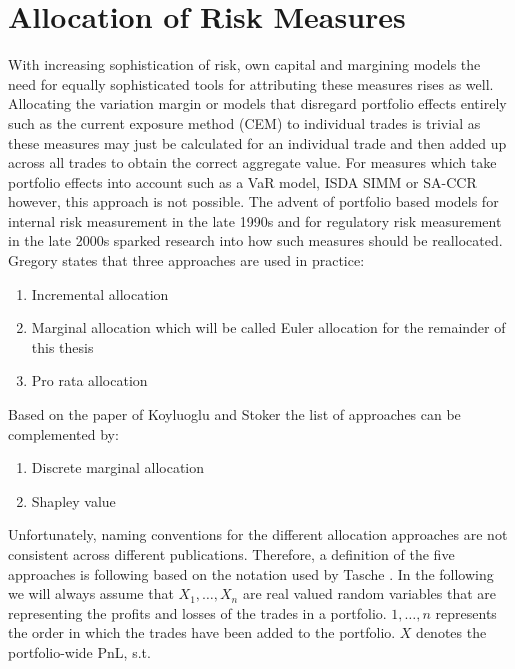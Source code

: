 \documentclass[../Thesis_AHoecherl.tex]{subfiles}
\begin{document}
\section{Allocation of Risk Measures}\label{sec:Allocation of Risk Measures}

With increasing sophistication of risk, own capital and margining models the need for equally sophisticated tools for attributing these measures rises as well. Allocating the variation margin or models that disregard portfolio effects entirely such as the current exposure method (\gls{CEM}) to individual trades is trivial as these measures may just be calculated for an individual trade and then added up across all trades to obtain the correct aggregate value. 
For measures which take portfolio effects into account such as a \gls{VaR} model, \gls{ISDA SIMM} or \gls{SA-CCR} however, this approach is not possible. The advent of portfolio based models for internal risk measurement in the late 1990s and for regulatory risk measurement in the late 2000s sparked research into how such measures should be reallocated. Gregory \cite[Chapter~10.7]{gregory2015xva} states that three approaches are used in practice: 
\begin{enumerate}
\item Incremental allocation
\item Marginal allocation which will be called Euler allocation for the remainder of this thesis  
\item Pro rata allocation
\end{enumerate}

Based on the paper of Koyluoglu and Stoker \cite{koyluoglu2002risk} the list of approaches can be complemented by:
\begin{enumerate}[resume]
    \item Discrete marginal allocation
    \item Shapley value
\end{enumerate}
 
Unfortunately, naming conventions for the different allocation approaches are not consistent across different publications.
Therefore, a definition of the five approaches is following based on the notation used by Tasche \cite{tasche2007}. In the following we will always assume that $X_1, \dots, X_n$ are real valued random variables that are representing the profits and losses of the trades in a portfolio. $1, \dots, n$ represents the order in which the trades have been added to the portfolio. $X$ denotes the portfolio-wide \gls{PnL}, s.t.
\end{document}
